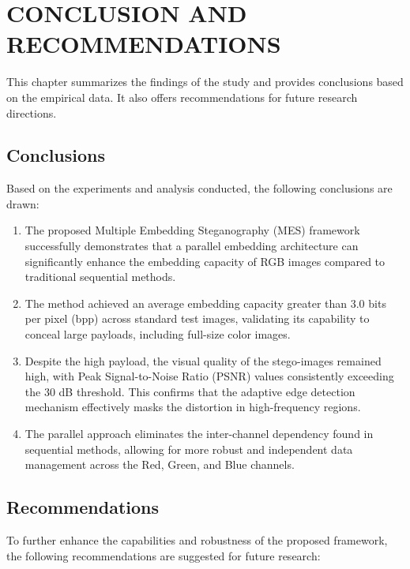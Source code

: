 \chapter{CONCLUSION AND RECOMMENDATIONS}

This chapter summarizes the findings of the study and provides conclusions based on the empirical data. It also offers recommendations for future research directions.

\section{Conclusions}
Based on the experiments and analysis conducted, the following conclusions are drawn:

\begin{enumerate}
    \item The proposed Multiple Embedding Steganography (MES) framework successfully demonstrates that a parallel embedding architecture can significantly enhance the embedding capacity of RGB images compared to traditional sequential methods.
    \item The method achieved an average embedding capacity greater than 3.0 bits per pixel (bpp) across standard test images, validating its capability to conceal large payloads, including full-size color images.
    \item Despite the high payload, the visual quality of the stego-images remained high, with Peak Signal-to-Noise Ratio (PSNR) values consistently exceeding the 30 dB threshold. This confirms that the adaptive edge detection mechanism effectively masks the distortion in high-frequency regions.
    \item The parallel approach eliminates the inter-channel dependency found in sequential methods, allowing for more robust and independent data management across the Red, Green, and Blue channels.
\end{enumerate}

\section{Recommendations}
To further enhance the capabilities and robustness of the proposed framework, the following recommendations are suggested for future research:

